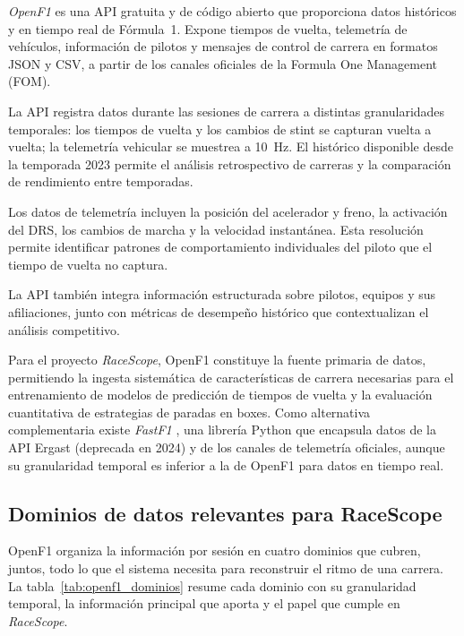 \textit{OpenF1} \cite{openf1api} es una API gratuita y de código abierto que proporciona datos históricos y en tiempo real de Fórmula~1. Expone tiempos de vuelta, telemetría de vehículos, información de pilotos y mensajes de control de carrera en formatos JSON y CSV, a partir de los canales oficiales de la Formula One Management (FOM).

La API registra datos durante las sesiones de carrera a distintas granularidades temporales: los tiempos de vuelta y los cambios de stint se capturan vuelta a vuelta; la telemetría vehicular se muestrea a \SI{10}{Hz}. El histórico disponible desde la temporada 2023 permite el análisis retrospectivo de carreras y la comparación de rendimiento entre temporadas.

Los datos de telemetría incluyen la posición del acelerador y freno, la activación del DRS, los cambios de marcha y la velocidad instantánea. Esta resolución permite identificar patrones de comportamiento individuales del piloto que el tiempo de vuelta no captura.

La API también integra información estructurada sobre pilotos, equipos y sus afiliaciones, junto con métricas de desempeño histórico que contextualizan el análisis competitivo.

Para el proyecto \textit{RaceScope}, OpenF1 constituye la fuente primaria de datos, permitiendo la ingesta sistemática de características de carrera necesarias para el entrenamiento de modelos de predicción de tiempos de vuelta y la evaluación cuantitativa de estrategias de paradas en boxes. Como alternativa complementaria existe \textit{FastF1} \cite{fastf1lib}, una librería Python que encapsula datos de la API Ergast (deprecada en 2024) y de los canales de telemetría oficiales, aunque su granularidad temporal es inferior a la de OpenF1 para datos en tiempo real.

\subsection{Dominios de datos relevantes para RaceScope}
\label{subsec:openf1_endpoints}

OpenF1 organiza la información por sesión en cuatro dominios que cubren, juntos, todo lo que el sistema necesita para reconstruir el ritmo de una carrera. La tabla~\ref{tab:openf1_dominios} resume cada dominio con su granularidad temporal, la información principal que aporta y el papel que cumple en \textit{RaceScope}.


